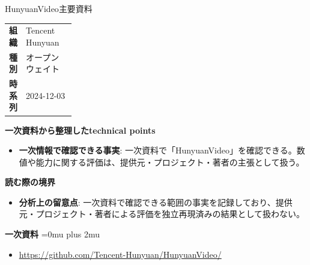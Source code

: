 \begin{technicalnote}{HunyuanVideo}{主要資料}
\begingroup
\begin{tabularx}{\linewidth}{@{}>{\bfseries}p{0.22\linewidth}X@{}}
組織 & Tencent Hunyuan \\
種別 & オープンウェイト \\
時系列 & 2024-12-03 \\
\end{tabularx}
\smallskip
{\bfseries 一次資料から整理したtechnical points}
\begin{itemize}[leftmargin=1.5em,itemsep=0.35em]
\item \textbf{一次情報で確認できる事実}: 一次資料で「HunyuanVideo」を確認できる。数値や能力に関する評価は、提供元・プロジェクト・著者の主張として扱う。
\end{itemize}
\begin{minipage}{\linewidth}
{\bfseries 読む際の境界}
\begin{itemize}[leftmargin=1.5em,itemsep=0.35em]
\item \textbf{分析上の留意点}: 一次資料で確認できる範囲の事実を記録しており、提供元・プロジェクト・著者による評価を独立再現済みの結果として扱わない。
\end{itemize}
\begin{samepage}
{\bfseries 一次資料}
\begingroup\sloppy
\Urlmuskip=0mu plus 2mu\relax
\begin{itemize}[leftmargin=1.5em,itemsep=0.25em]
\item {\scriptsize\url{https://github.com/Tencent-Hunyuan/HunyuanVideo/}}
\end{itemize}
\endgroup
\end{samepage}
\end{minipage}
\endgroup
\end{technicalnote}
\medskip

